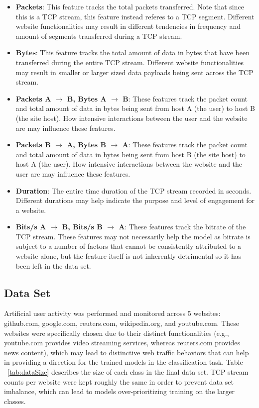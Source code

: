 \documentclass[10pt,sigconf,letterpaper,nonacm]{acmart}
\begin{document}
\begin{itemize}
  \item \textbf{Packets}: This feature tracks the total packets transferred. Note that since this is a TCP stream, this feature instead referes to a TCP segment. Different website functionalities may result in different tendencies in frequency and amount of segments transferred during a TCP stream.
  
  \item \textbf{Bytes}: This feature tracks the total amount of data in bytes that have been transferred during the entire TCP stream. Different website functionalities may result in smaller or larger sized data payloads being sent across the TCP stream.
  
  \item \textbf{Packets A $\rightarrow$ B, Bytes A $\rightarrow$ B}: These features track the packet count and total amount of data in bytes being sent from host A (the user) to host B (the site host). How intensive interactions between the user and the website are may influence these features.
  
  \item \textbf{Packets B $\rightarrow$ A, Bytes B $\rightarrow$ A}: These features track the packet count and total amount of data in bytes being sent from host B (the site host) to host A (the user). How intensive interactions between the website and the user are may influence these features.
  
  \item \textbf{Duration}: The entire time duration of the TCP stream recorded in seconds. Different durations may help indicate the purpose and level of engagement for a website.
  
  \item \textbf{Bits/s A $\rightarrow$ B, Bits/s B $\rightarrow$ A}: These features track the bitrate of the TCP stream. These features may not necessarily help the model as bitrate is subject to a number of factors that cannot be consistently attributed to a website alone, but the feature itself is not inherently detrimental so it has been left in the data set.
\end{itemize}

\subsection{Data Set}

Artificial user activity was performed and monitored across 5 websites: github.com, google.com, reuters.com, wikipedia.org, and youtube.com.
These websites were specifically chosen due to their distinct functionalities (e.g., youtube.com provides video streaming services, whereas reuters.com provides news content), which may lead to distinctive web traffic behaviors that can help in providing a direction for the trained models in the classification task.
Table ~\ref{tab:dataSize} describes the size of each class in the final data set.
TCP stream counts per website were kept roughly the same in order to prevent data set imbalance, which can lead to models over-prioritizing training on the larger classes.
\end{document}
